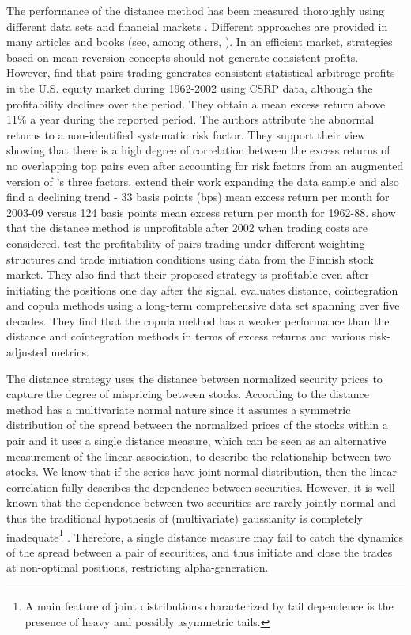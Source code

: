 	The performance of the distance method has been measured thoroughly using different data sets and financial markets \citep{ggr06,p09,df10,df12,bv12,cm13,rf15}. Different approaches are provided in many articles and books (see, among others, \citet{v04,elliott2005,do2006,avellaneda2010,bogomolov2013,stubinger2016,liu2017,stubinger2018}). In an efficient market, strategies based on mean-reversion concepts should not generate consistent profits. However, \citet*{ggr06} find that pairs trading generates consistent statistical arbitrage profits in the U.S. equity market during 1962-2002 using CSRP data, although the profitability declines over the period. They obtain a mean excess return above 11\% a year during the reported period. The authors attribute the abnormal returns to a non-identified systematic risk factor. They support their view showing that there is a high degree of correlation between the excess returns of no overlapping top pairs even after accounting for risk factors from an augmented version of \citet*{ff93}'s three factors. \citet*{df10} extend their work expanding the data sample and also find a declining trend - 33 basis points (bps) mean excess return per month for 2003-09 versus 124 basis points mean excess return per month for 1962-88. \citet*{df12} show that the distance method is unprofitable after 2002 when trading costs are considered. \citet*{bv12} test the profitability of pairs trading under different weighting structures and trade initiation conditions using data from the Finnish stock market. They also find that their proposed strategy is profitable even after initiating the positions one day after the signal. \citet*{rf15} evaluates distance, cointegration and copula methods using a long-term comprehensive data set spanning over five decades. They find that the copula method has a weaker performance than the distance and cointegration methods in terms of excess returns and various risk-adjusted metrics.
	
The distance strategy \citep{ggr06} uses the distance between normalized security prices to capture the degree of mispricing between stocks. According to \citet*{xie14} the distance method has a multivariate normal nature since it assumes a symmetric distribution of the spread between the normalized prices of the stocks within a pair and it uses a single distance measure, which can be seen as an alternative measurement of the linear association, to describe the relationship between two stocks. We know that if the series have joint normal distribution, then the linear correlation fully describes the dependence between securities. However, it is well known that the dependence between two securities are rarely jointly normal and thus the traditional hypothesis of (multivariate) gaussianity is completely inadequate\footnote{A main feature of joint distributions characterized by tail dependence is the presence of heavy and possibly asymmetric tails.} \citep{campbell97,cont01,ane03,mcneil15}.  Therefore, a single distance measure may fail to catch the dynamics of the spread between a pair of securities, and thus initiate and close the trades at non-optimal positions, restricting alpha-generation.
	
